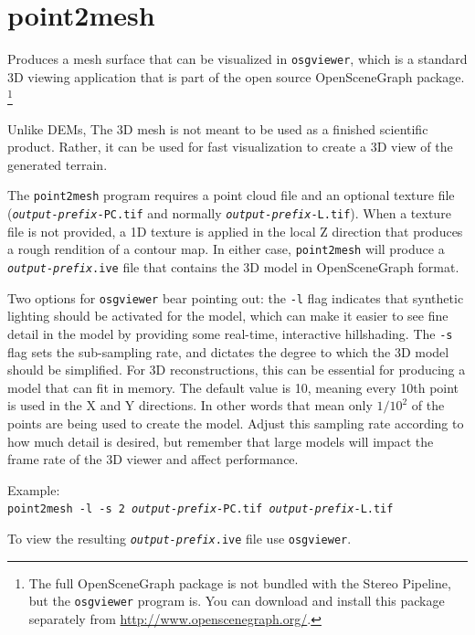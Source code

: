 \section{point2mesh}
\label{point2mesh}

Produces a mesh surface that can be visualized in {\tt osgviewer},
which is a standard 3D viewing application that is part of the open
source OpenSceneGraph package.  \footnote{The full OpenSceneGraph package
is not bundled with the Stereo Pipeline, but the \texttt{osgviewer} program
is.  You can download and install this package separately from
\url{http://www.openscenegraph.org/}.}

Unlike \acp{DEM}, The 3D mesh is not meant to be used as a finished
scientific product.  Rather, it can be used for fast visualization
to create a 3D view of the generated terrain.

The \texttt{point2mesh} program requires a point cloud file and an
optional texture file (\texttt{\textit{output-prefix}-PC.tif} and
normally \texttt{\textit{output-prefix}-L.tif}). When a texture
file is not provided, a 1D texture is applied in the local Z direction
that produces a rough rendition of a contour map.  In either case,
\texttt{point2mesh} will produce a \texttt{\textit{output-prefix}.ive}
file that contains the 3D model in OpenSceneGraph format.

Two options for \texttt{osgviewer} bear pointing out: the \texttt{-l}
flag indicates that synthetic lighting should be activated for the
model, which can make it easier to see fine detail in the model by
providing some real-time, interactive hillshading.  The \verb#-s#
flag sets the sub-sampling rate, and dictates the degree to which
the 3D model should be simplified.  For 3D reconstructions, this
can be essential for producing a model that can fit in memory.  The
default value is 10, meaning every 10th point is used in the X and
Y directions. In other words that mean only $1/10^2$ of the points
are being used to create the model. Adjust this sampling rate
according to how much detail is desired, but remember that large
models will impact the frame rate of the 3D viewer and affect
performance.

Example:\\
\hspace*{2em}\texttt{point2mesh -l -s 2 \textit{output-prefix}-PC.tif \textit{output-prefix}-L.tif}

To view the resulting \texttt{\textit{output-prefix}.ive} file use
\texttt{osgviewer}.

